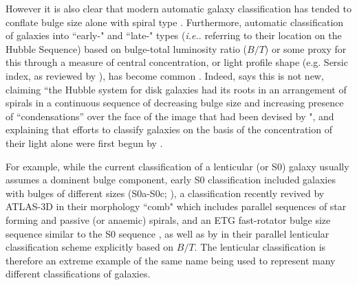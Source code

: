 \documentclass[usenatbib]{mn2e}
\newcommand{\ie}{{\it i.e.}}
\begin{document}
However it is also clear that modern automatic galaxy classification has tended to conflate bulge size alone with spiral type \citep[e.g.][]{Goto2003, Laurikainen2007, gadotti2009, Masters2010}. Furthermore, automatic classification of galaxies into ``early-" and ``late-" types (\ie. referring to their location on the Hubble Sequence) based on bulge-total luminosity ratio ($B/T$) or some proxy for this through a measure of central concentration, or light profile shape (e.g. Sersic index, as reviewed by \citealt{2005PASA...22..118G}), has become common \citep[e.g.][]{vanderWel2011}. Indeed, \citet{Sandage2005} says this is not new, claiming ``the Hubble system for disk galaxies had its roots in an arrangement of spirals in a continuous sequence of decreasing bulge size and increasing presence of ``condensations'' over the face of the image that had been devised by \citet{Reynolds1920}", and explaining that efforts to classify galaxies on the basis of the concentration of their light alone were first begun by \citet{Shapley1927}. 

 For example, while the current classification of a lenticular (or S0) galaxy usually assumes a dominent bulge component, early S0 classification included galaxies with bulges of different sizes (S0a-S0c; \citealt{SpitzerBaade1951, vandenBergh1976}), a classification recently revived by ATLAS-3D in their morphology ``comb" which includes parallel sequences of star forming and passive (or anaemic) spirals, and an ETG fast-rotator bulge size sequence similar to the S0 sequence \citep{2011MNRAS.416.1680C}, as well as by \citet{Kormendy2012} in their parallel lenticular classification scheme explicitly based on $B/T$. The lenticular classification is therefore an extreme example of the same name being used to represent many different classifications of galaxies. 

\end{document}
